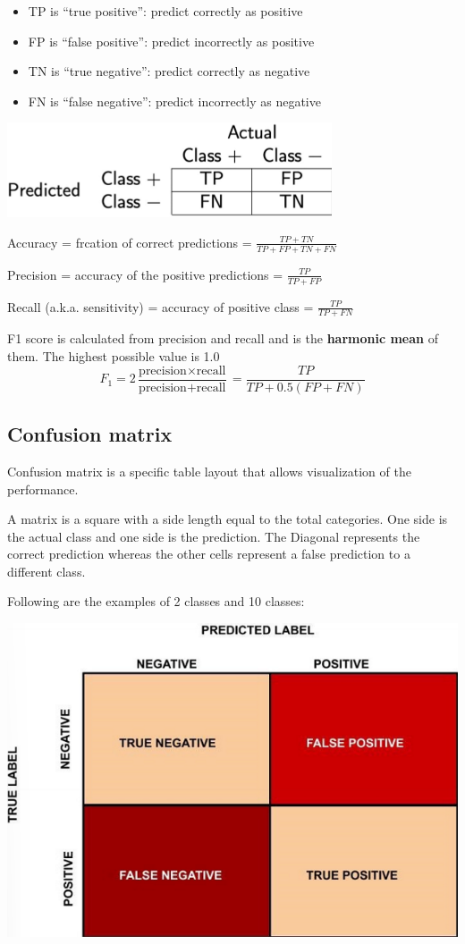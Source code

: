 \documentclass[letterpaper,12pt]{article}
\begin{document}
\begin{itemize}
    \item TP is ``true positive'': predict correctly as positive
    \item FP is ``false positive'': predict incorrectly as positive
    \item TN is ``true negative'': predict correctly as negative
    \item FN is ``false negative'': predict incorrectly as negative
\end{itemize}

\includegraphics{Image/Metrics to evaluate models.png}

Accuracy = frcation of correct predictions = $\frac{TP+TN}{TP+FP+TN+FN}$

Precision = accuracy of the positive predictions = $\frac{TP}{TP+FP}$

Recall (a.k.a. sensitivity) = accuracy of positive class = $\frac{TP}{TP+FN}$

F1 score is calculated from precision and recall and is the \textbf{harmonic
    mean} of them. The highest possible value is 1.0
\[
    F_1=2\frac{\text{precision}\times\text{recall}}{\text{precision}+\text{recall}}  = \frac{TP}{TP+0.5(FP+FN)}
\]

\subsection{Confusion matrix}
Confusion matrix is a specific table layout that allows visualization of the
performance.

A matrix is a square with a side length equal to the total categories. One side is
the actual class and one side is the prediction. The Diagonal represents the correct
prediction whereas the other cells represent a false prediction to a different
class.

Following are the examples of 2 classes and 10 classes:

\includegraphics{./Image/Confusion matrix 2 class.png}
\end{document}
